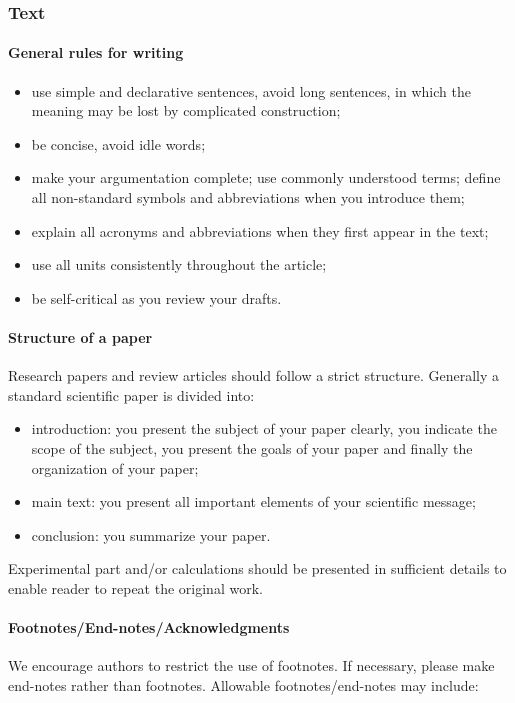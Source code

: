 \documentclass[USenglish,oneside,twocolumn]{article}
\begin{document}
\subsubsection{Text}

\paragraph{General rules for writing}
\begin{itemize}
\item use simple and declarative sentences, avoid long sentences, in which the meaning may be lost by complicated construction;
\item be concise, avoid idle words;
\item make your argumentation complete; use commonly understood terms; define all non-standard symbols and abbreviations when you introduce them;
\item explain all acronyms and abbreviations when they first appear in the text;
\item use all units consistently throughout the article;
\item be self-critical as you review your drafts.
\end{itemize}

\paragraph{Structure of a paper}
    Research papers and review articles should follow a strict structure. Generally a standard scientific paper is divided into:
\begin{itemize}
\item introduction: you present the subject of your paper clearly, you indicate the scope of the subject, you present the goals of your paper and finally the organization of your paper;
\item main text: you present all important elements of your scientific message;
\item conclusion: you summarize your paper.
\end{itemize}


    Experimental part and/or calculations should be presented in sufficient details to enable reader to repeat the original work.



\paragraph{Footnotes/End-notes/Acknowledgments}
We encourage authors to restrict the use of footnotes. If necessary, please make end-notes rather than footnotes. Allowable footnotes/end-notes may include:
\end{document}

